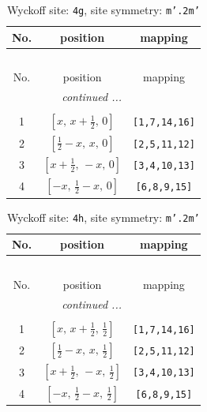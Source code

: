 \documentclass[fleqn,8pt]{jsarticle}
\begin{document}
\renewcommand{\arraystretch}{1.2}
\begin{longtable}{ccc}
\caption{Wyckoff site: {\tt 4g}, site symmetry: {\tt m'.2m'}}
 \\
 \hline \hline
No. & position & mapping \\ \hline \endfirsthead

\multicolumn{2}{l}{\tablename\ \thetable{}} \\
 \hline \hline
No. & position & mapping \\ \hline \endhead

 \hline \hline
\multicolumn{2}{r}{\footnotesize\it continued ...} \\ \endfoot

 \hline \hline
\multicolumn{2}{r}{} \\ \endlastfoot

1 & $\left[ x,\, x + \frac{1}{2},\, 0 \right]$ & {\tt [1,7,14,16]} \\ \hline
2 & $\left[ \frac{1}{2} - x,\, x,\, 0 \right]$ & {\tt [2,5,11,12]} \\ \hline
3 & $\left[ x + \frac{1}{2},\, - x,\, 0 \right]$ & {\tt [3,4,10,13]} \\ \hline
4 & $\left[ - x,\, \frac{1}{2} - x,\, 0 \right]$ & {\tt [6,8,9,15]} \\
\end{longtable}
\renewcommand{\arraystretch}{1.2}
\begin{longtable}{ccc}
\caption{Wyckoff site: {\tt 4h}, site symmetry: {\tt m'.2m'}}
 \\
 \hline \hline
No. & position & mapping \\ \hline \endfirsthead

\multicolumn{2}{l}{\tablename\ \thetable{}} \\
 \hline \hline
No. & position & mapping \\ \hline \endhead

 \hline \hline
\multicolumn{2}{r}{\footnotesize\it continued ...} \\ \endfoot

 \hline \hline
\multicolumn{2}{r}{} \\ \endlastfoot

1 & $\left[ x,\, x + \frac{1}{2},\, \frac{1}{2} \right]$ & {\tt [1,7,14,16]} \\ \hline
2 & $\left[ \frac{1}{2} - x,\, x,\, \frac{1}{2} \right]$ & {\tt [2,5,11,12]} \\ \hline
3 & $\left[ x + \frac{1}{2},\, - x,\, \frac{1}{2} \right]$ & {\tt [3,4,10,13]} \\ \hline
4 & $\left[ - x,\, \frac{1}{2} - x,\, \frac{1}{2} \right]$ & {\tt [6,8,9,15]} \\
\end{longtable}
\end{document}
